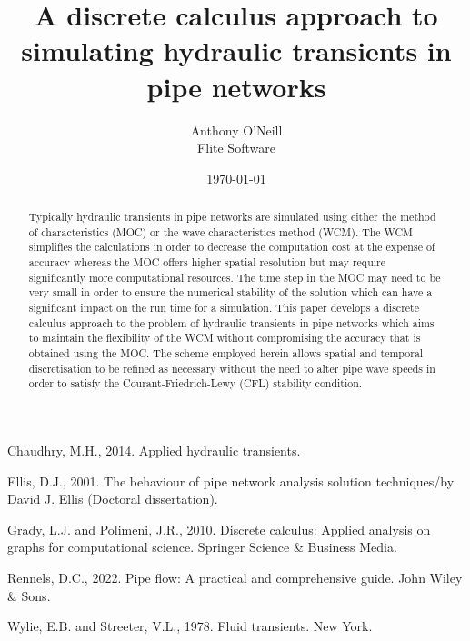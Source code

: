 \documentclass[12pt]{article}
\title{A discrete calculus approach to simulating hydraulic transients in pipe networks}
\author{Anthony O'Neill  \\
	Flite Software  \\
	}
\date{\today}
\begin{document}
\maketitle

\begin{abstract}
Typically hydraulic transients in pipe networks are simulated using either the method of characteristics (MOC) or the wave characteristics method (WCM). The WCM simplifies the calculations in order to decrease the computation cost at the expense of accuracy whereas the MOC offers higher spatial resolution but may require significantly more computational resources. The time step in the MOC may need to be very small in order to ensure the numerical stability of the solution which can have a significant impact on the run time for a simulation. This paper develops a discrete calculus approach to the problem of hydraulic transients in pipe networks which aims to maintain the flexibility of the WCM without compromising the accuracy that is obtained using the MOC. The scheme employed herein allows spatial and temporal discretisation to be refined as necessary without the need to alter pipe wave speeds in order to satisfy the Courant-Friedrich-Lewy (CFL) stability condition.
\end{abstract}












\begin{thebibliography}{9}
 Chaudhry, M.H., 2014. Applied hydraulic transients.

 Ellis, D.J., 2001. The behaviour of pipe network analysis solution techniques/by David J. Ellis (Doctoral dissertation).

 Grady, L.J. and Polimeni, J.R., 2010. Discrete calculus: Applied analysis on graphs for computational science. Springer Science \& Business Media.

 Rennels, D.C., 2022. Pipe flow: A practical and comprehensive guide. John Wiley \& Sons.

 Wylie, E.B. and Streeter, V.L., 1978. Fluid transients. New York.

\end{thebibliography}
\end{document}
